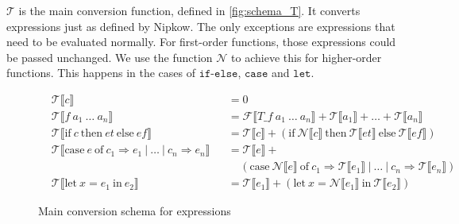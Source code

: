 $\mathcal{T}$ is the main conversion function, defined in \autoref{fig:schema_T}.
It converts expressions just as defined by Nipkow.
The only exceptions are expressions that need to be evaluated normally.
For first-order functions, those expressions could be passed unchanged.
We use the function $\mathcal{N}$ to achieve this for higher-order functions.
This happens in the cases of $\texttt{if-else}$, $\texttt{case}$ and $\texttt{let}$.
\begin{figure}
\begin{align*}
  &\mathcal{T}\llbracket c\rrbracket &&= 0\\
  &\mathcal{T}\llbracket f\ a_{1}\ \dots\ a_{n}\rrbracket &&= \mathcal{F}\llbracket T\_f\ a_{1}\ \dots\ a_{n}\rrbracket + \mathcal{T}\llbracket a_{1}\rrbracket + \dots + \mathcal{T}\llbracket a_{n}\rrbracket\\
  &\mathcal{T}\llbracket \text{if}\ c\ \text{then}\ et\ \text{else}\ ef\rrbracket &&= \mathcal{T}\llbracket c\rrbracket + (\text{if}\ \mathcal{N}\llbracket c\rrbracket\ \text{then}\ \mathcal{T}\llbracket et\rrbracket\ \text{else}\ \mathcal{T}\llbracket ef\rrbracket)\\
  &\mathcal{T}\llbracket \text{case}\ e\ \text{of}\ c_{1} \Rightarrow e_{1}\ |\ \dots\ |\ c_{n}\Rightarrow e_{n}\rrbracket &&= \mathcal{T}\llbracket e\rrbracket + \\
  & &&\ \ \ \ \ (\text{case}\ \mathcal{N}\llbracket e\rrbracket\ \text{of}\ c_{1}\Rightarrow\mathcal{T}\llbracket e_{1}\rrbracket\ |\ \dots\ |\ c_{n} \Rightarrow \mathcal{T}\llbracket e_{n}\rrbracket)\\
  &\mathcal{T}\llbracket \text{let}\ x = e_{1}\ \text{in}\ e_{2}\rrbracket &&= \mathcal{T}\llbracket e_{1}\rrbracket + (\text{let}\ x = \mathcal{N}\llbracket e_{1}\rrbracket\ \text{in}\ \mathcal{T}\llbracket e_{2}\rrbracket)
\end{align*}
  \caption{Main conversion schema for expressions}
  \label{fig:schema_T}
\end{figure}


